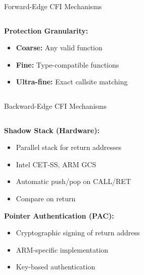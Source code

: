 \documentclass[aspectratio=169,12pt]{beamer}
\begin{document}
\begin{frame}[fragile]{Forward-Edge CFI Mechanisms}
\begin{columns}
\begin{column}{0.5\textwidth}
            \textbf{Protection Granularity:}
            \begin{itemize}
                \item \textbf{Coarse:} Any valid function
                \item \textbf{Fine:} Type-compatible functions
                \item \textbf{Ultra-fine:} Exact callsite matching
            \end{itemize}
        \end{column}
    \end{columns}
\end{frame}

\begin{frame}{Backward-Edge CFI Mechanisms}
    \begin{columns}
        \begin{column}{0.5\textwidth}
            \textbf{Shadow Stack (Hardware):}
            \begin{itemize}
                \item Parallel stack for return addresses
                \item Intel CET-SS, ARM GCS
                \item Automatic push/pop on CALL/RET
                \item Compare on return
            \end{itemize}
            
            \vspace{0.3cm}
            \textbf{Pointer Authentication (PAC):}
            \begin{itemize}
                \item Cryptographic signing of return address
                \item ARM-specific implementation
                \item Key-based authentication
            \end{itemize}
            

\end{column}
\end{columns}
\end{frame}
\end{document}
